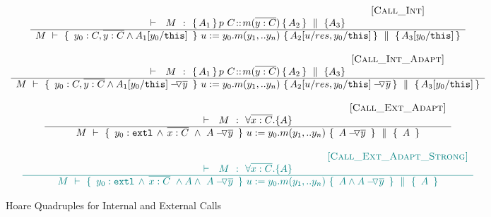 \begin{figure}[htb]
\small{
$\begin{array}{c}
 \inferruleSD{\hspace{4.7cm} [\sc{Call\_Int}]}
	{
	   	\begin{array}{l}
		\promises  M {\mprepostN{A_1}{p\ C}{m}{y}{C}{A_2} {A_3}}  
          	\end{array}
		}
	{  \hprovesN {M} 
						{ \  y_0:C,\overline {y:C} \wedge  A_1[y_0/\prg{this}] \ }
						 { \ u:=y_0.m(y_1,.. y_n)\    }
					         { A_2[ u/res,y_0/\prg{this}] } 
						{   A_3[y_0/\prg{this}]   }	
}
 \\
\\
{ \inferruleSD{\hspace{4.7cm} [\sc{Call\_Int\_Adapt}]}
	{
	   	\begin{array}{l}
		\promises  M {\mprepostN{A_1}{p\ C}{m}{y}{C}{A_2} {A_3}}  
          	\end{array}
		}
	{  \hprovesN {M} 
						{ \  y_0:C, \overline {y:C} \wedge {\PushAS {y}{A_1[y_0/\prg{this}]}}  \ }  
						{ \ u:=y_0.m(y_1,.. y_n)\    }
						{  { \PushAS {y}{A_2[ u/res,y_0/\prg{this}]}}   }
						{   A_3[y_0/\prg{this}]  }	
}
}
\\
 \\ 
 \inferruleSD{\hspace{4.7cm} [\sc{Call\_Ext}\_Adapt]}
 	{ 
   	 \promises M   {\TwoStatesN {\overline {x:C}} {A}} 
        }
	{   \hprovesN{M} 
						{ \    { \external{y_0}} \,     \wedge \,  \overline{x:C}\  \wedge\ {\PushAS {y}{A}}\ }  
						{ \ u:=y_0.m(y_1,.. y_n)\    }
						{ \   {\PushAS {y}{A}}  \ }
						{\  A \   }	
}
\\
 \\ 
\sdN{
 \inferruleSD{\hspace{4.7cm} [\sc{Call\_Ext}\_Adapt\_Strong]}
 	{ 
   	 \promises M   {\TwoStatesN {\overline {x:C}} {A}} 
        }
	{   \hprovesN{M} 
						{ \    { \external{y_0}} \,     \wedge \,  \overline{x:C}\ \wedge  A   \wedge\ {\PushAS {y}{A}}\ }  
						{ \ u:=y_0.m(y_1,.. y_n)\    }
						{ \   A \wedge {\PushAS {y}{A}}  \ }
						{\  A \   }	
}
}

\end{array}
$
}
\caption{Hoare Quadruples for Internal and External Calls}
\label{f:internal:calls}
\label{f:external:calls}
\label{f:calls}
\end{figure}

